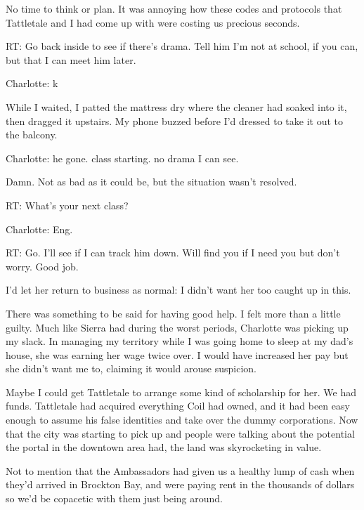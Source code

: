 No time to think or plan.  It was annoying how these codes and protocols that Tattletale and I had come up with were costing us precious seconds.



RT:
Go back inside to see if there's drama.  Tell him I'm not at school, if you can, but that I can meet him later.



Charlotte:
k



While I waited, I patted the mattress dry where the cleaner had soaked into it, then dragged it upstairs.  My phone buzzed before I'd dressed to take it out to the balcony.



Charlotte:
he gone.  class starting.  no drama I can see.



Damn.  Not as bad as it could be, but the situation wasn't resolved.



RT:
What's your next class?



Charlotte:
Eng.



RT:
Go.  I'll see if I can track him down.  Will find you if I need you but don't worry.  Good job.



I'd let her return to business as normal: I didn't want her too caught up in this.



There was something to be said for having good help.  I felt more than a little guilty.  Much like Sierra had during the worst periods, Charlotte was picking up my slack.  In managing my territory while I was going home to sleep at my dad's house, she was earning her wage twice over.  I would have increased her pay but she didn't want me to, claiming it would arouse suspicion.



Maybe I could get Tattletale to arrange some kind of scholarship for her.  We had funds.  Tattletale had acquired everything Coil had owned, and it had been easy enough to assume his false identities and take over the dummy corporations.  Now that the city was starting to pick up and people were talking about the potential the portal in the downtown area had, the land was skyrocketing in value.



Not to mention that the Ambassadors had given us a healthy lump of cash when they'd arrived in Brockton Bay, and were paying rent in the thousands of dollars so we'd be copacetic with them just being around.




